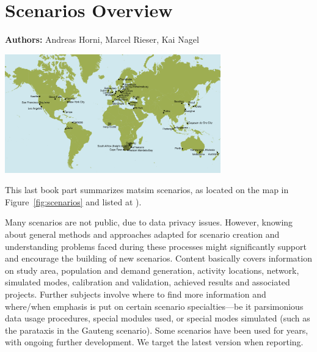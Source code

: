 \chapter{Scenarios Overview}
\label{ch:scenarios}

\hfill \textbf{Authors:} Andreas Horni, Marcel Rieser, Kai Nagel

\begin{center} \includegraphics[width=0.7\textwidth, angle=0]{./scenarios/figures/MATSimModelsMap} \end{center}


This last book part summarizes \gls{matsim} scenarios, as located on the map in Figure~\ref{fig:scenarios} and listed at \citet[][]{MATSIM-Scenarios_Webpage_2015}).

Many scenarios are not public, due to data privacy issues. However, knowing about general methods and approaches adapted for scenario creation and understanding problems faced during these processes might significantly support and encourage the building of new scenarios. Content basically covers information on study area, population and demand generation, activity locations, network, simulated modes, calibration and validation, achieved results and associated projects. Further subjects involve where to find more information and where/when emphasis is put on certain scenario specialties---be it parsimonious data usage procedures, special modules used, or special modes simulated (such as the parataxis in the Gauteng scenario). Some scenarios have been used for years, with ongoing further development. We target the latest version when reporting. 

